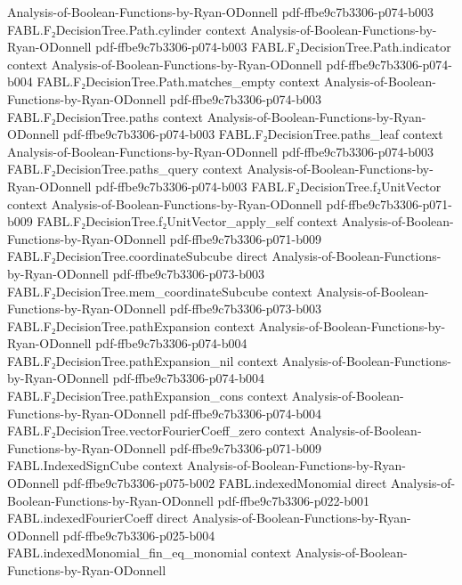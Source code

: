 \begin{theorem}
  {Analysis-of-Boolean-Functions-by-Ryan-ODonnell}
  {pdf-ffbe9c7b3306-p074-b003}
\proofstep
  {FABL.F₂DecisionTree.Path.cylinder}
  {context}
  {Analysis-of-Boolean-Functions-by-Ryan-ODonnell}
  {pdf-ffbe9c7b3306-p074-b003}
\proofstep
  {FABL.F₂DecisionTree.Path.indicator}
  {context}
  {Analysis-of-Boolean-Functions-by-Ryan-ODonnell}
  {pdf-ffbe9c7b3306-p074-b004}
\proofstep
  {FABL.F₂DecisionTree.Path.matches_empty}
  {context}
  {Analysis-of-Boolean-Functions-by-Ryan-ODonnell}
  {pdf-ffbe9c7b3306-p074-b003}
\proofstep
  {FABL.F₂DecisionTree.paths}
  {context}
  {Analysis-of-Boolean-Functions-by-Ryan-ODonnell}
  {pdf-ffbe9c7b3306-p074-b003}
\proofstep
  {FABL.F₂DecisionTree.paths_leaf}
  {context}
  {Analysis-of-Boolean-Functions-by-Ryan-ODonnell}
  {pdf-ffbe9c7b3306-p074-b003}
\proofstep
  {FABL.F₂DecisionTree.paths_query}
  {context}
  {Analysis-of-Boolean-Functions-by-Ryan-ODonnell}
  {pdf-ffbe9c7b3306-p074-b003}
\proofstep
  {FABL.F₂DecisionTree.f₂UnitVector}
  {context}
  {Analysis-of-Boolean-Functions-by-Ryan-ODonnell}
  {pdf-ffbe9c7b3306-p071-b009}
\proofstep
  {FABL.F₂DecisionTree.f₂UnitVector_apply_self}
  {context}
  {Analysis-of-Boolean-Functions-by-Ryan-ODonnell}
  {pdf-ffbe9c7b3306-p071-b009}
\proofstep
  {FABL.F₂DecisionTree.coordinateSubcube}
  {direct}
  {Analysis-of-Boolean-Functions-by-Ryan-ODonnell}
  {pdf-ffbe9c7b3306-p073-b003}
\proofstep
  {FABL.F₂DecisionTree.mem_coordinateSubcube}
  {context}
  {Analysis-of-Boolean-Functions-by-Ryan-ODonnell}
  {pdf-ffbe9c7b3306-p073-b003}
\proofstep
  {FABL.F₂DecisionTree.pathExpansion}
  {context}
  {Analysis-of-Boolean-Functions-by-Ryan-ODonnell}
  {pdf-ffbe9c7b3306-p074-b004}
\proofstep
  {FABL.F₂DecisionTree.pathExpansion_nil}
  {context}
  {Analysis-of-Boolean-Functions-by-Ryan-ODonnell}
  {pdf-ffbe9c7b3306-p074-b004}
\proofstep
  {FABL.F₂DecisionTree.pathExpansion_cons}
  {context}
  {Analysis-of-Boolean-Functions-by-Ryan-ODonnell}
  {pdf-ffbe9c7b3306-p074-b004}
\proofstep
  {FABL.F₂DecisionTree.vectorFourierCoeff_zero}
  {context}
  {Analysis-of-Boolean-Functions-by-Ryan-ODonnell}
  {pdf-ffbe9c7b3306-p071-b009}
\proofstep
  {FABL.IndexedSignCube}
  {context}
  {Analysis-of-Boolean-Functions-by-Ryan-ODonnell}
  {pdf-ffbe9c7b3306-p075-b002}
\proofstep
  {FABL.indexedMonomial}
  {direct}
  {Analysis-of-Boolean-Functions-by-Ryan-ODonnell}
  {pdf-ffbe9c7b3306-p022-b001}
\proofstep
  {FABL.indexedFourierCoeff}
  {direct}
  {Analysis-of-Boolean-Functions-by-Ryan-ODonnell}
  {pdf-ffbe9c7b3306-p025-b004}
\proofstep
  {FABL.indexedMonomial_fin_eq_monomial}
  {context}
  {Analysis-of-Boolean-Functions-by-Ryan-ODonnell}

\end{theorem}
